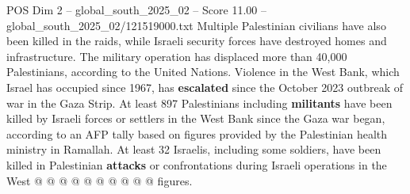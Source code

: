 \begin{textsample}{POS Dim 2 – global\_south\_2025\_02 – Score 11.00 – global\_south\_2025\_02/121519000.txt}
Multiple Palestinian civilians have also been killed in the raids, while Israeli security forces have destroyed homes and infrastructure.
The military operation has displaced more than 40,000 Palestinians, according to the United Nations.
Violence in the West Bank, which Israel has occupied since 1967, has \textbf{escalated} since the October 2023 outbreak of war in the Gaza Strip.
At least 897 Palestinians including \textbf{militants} have been killed by Israeli forces or settlers in the West Bank since the Gaza war began, according to an AFP tally based on figures provided by the Palestinian health ministry in Ramallah.
At least 32 Israelis, including some soldiers, have been killed in Palestinian \textbf{attacks} or confrontations during Israeli operations in the West @ @ @ @ @ @ @ @ @ @ figures.

\end{textsample}
